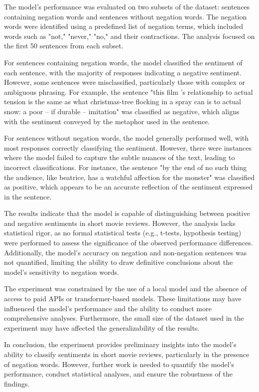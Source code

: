 \documentclass{article}
\begin{document}
The model's performance was evaluated on two subsets of the dataset: sentences containing negation words and sentences without negation words. The negation words were identified using a predefined list of negation terms, which included words such as "not," "never," "no," and their contractions. The analysis focused on the first 50 sentences from each subset.

For sentences containing negation words, the model classified the sentiment of each sentence, with the majority of responses indicating a negative sentiment. However, some sentences were misclassified, particularly those with complex or ambiguous phrasing. For example, the sentence "this film 's relationship to actual tension is the same as what christmas-tree flocking in a spray can is to actual snow: a poor -- if durable -- imitation" was classified as negative, which aligns with the sentiment conveyed by the metaphor used in the sentence.

For sentences without negation words, the model generally performed well, with most responses correctly classifying the sentiment. However, there were instances where the model failed to capture the subtle nuances of the text, leading to incorrect classifications. For instance, the sentence "by the end of no such thing the audience, like beatrice, has a watchful affection for the monster" was classified as positive, which appears to be an accurate reflection of the sentiment expressed in the sentence.

The results indicate that the model is capable of distinguishing between positive and negative sentiments in short movie reviews. However, the analysis lacks statistical rigor, as no formal statistical tests (e.g., t-tests, hypothesis testing) were performed to assess the significance of the observed performance differences. Additionally, the model's accuracy on negation and non-negation sentences was not quantified, limiting the ability to draw definitive conclusions about the model's sensitivity to negation words.

The experiment was constrained by the use of a local model and the absence of access to paid APIs or transformer-based models. These limitations may have influenced the model's performance and the ability to conduct more comprehensive analyses. Furthermore, the small size of the dataset used in the experiment may have affected the generalizability of the results.

In conclusion, the experiment provides preliminary insights into the model's ability to classify sentiments in short movie reviews, particularly in the presence of negation words. However, further work is needed to quantify the model's performance, conduct statistical analyses, and ensure the robustness of the findings.
\end{document}
